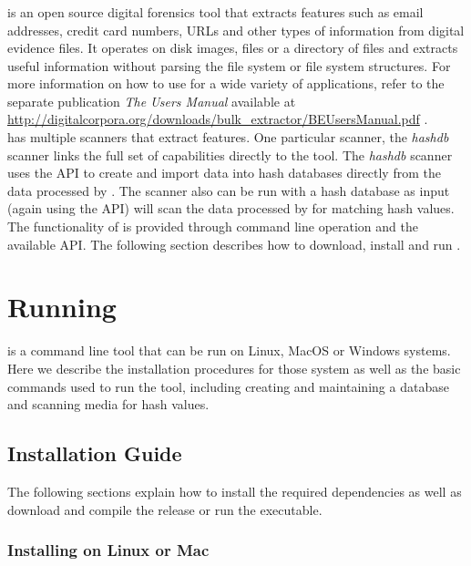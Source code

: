 \documentclass[11pt,fleqn]{article} %
\begin{document}
\subsubsection{\bulk}
\bulk is an open source digital forensics tool that extracts features such as email addresses, credit card numbers, URLs and other types of information from digital evidence files. It operates on disk images, files or a directory of files and extracts useful information without parsing the file system or file system structures.  For more information on how to use \bulk for a wide variety of applications, refer to the separate publication \textit{The \bulk Users Manual} available at \url{http://digitalcorpora.org/downloads/bulk_extractor/BEUsersManual.pdf} \cite{beusersguide}.\\

\bulk has multiple scanners that extract features. One particular scanner, the \textit{hashdb} scanner links the full set of \bulk capabilities directly to the \hash tool. The \textit{hashdb} scanner uses the \hash API to create and import data into hash databases  directly from the data processed by \bulk. The scanner also can be run with a hash database as input (again using the \hash API) will scan the data processed by \bulk for matching hash values.\\

The functionality of \hash is provided through command line operation and the available API. The following section describes how to download, install and run \hash. 
\section{Running \hash}
\hash is a command line tool that can be run on Linux, MacOS or Windows systems. Here we describe the installation procedures for those system as well as the basic commands used to run the tool, including creating and maintaining a database and scanning media for hash values.

\subsection{Installation Guide}
The following sections explain how to install the required dependencies as well as download \hash and compile the release or run the executable. 
\label{Installation}

\subsubsection{Installing on Linux or Mac}
\end{document}
